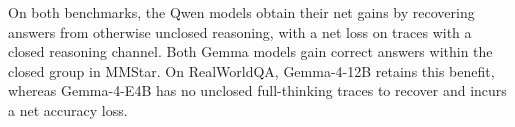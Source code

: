 \documentclass{article} %
\begin{document}
On both benchmarks, the Qwen models obtain their net gains by recovering answers from otherwise unclosed reasoning, with a net loss on traces with a closed reasoning channel. Both Gemma models gain correct answers within the closed group in MMStar. On RealWorldQA, Gemma-4-12B retains this benefit, whereas Gemma-4-E4B has no unclosed full-thinking traces to recover and incurs a net accuracy loss.
\end{document}

